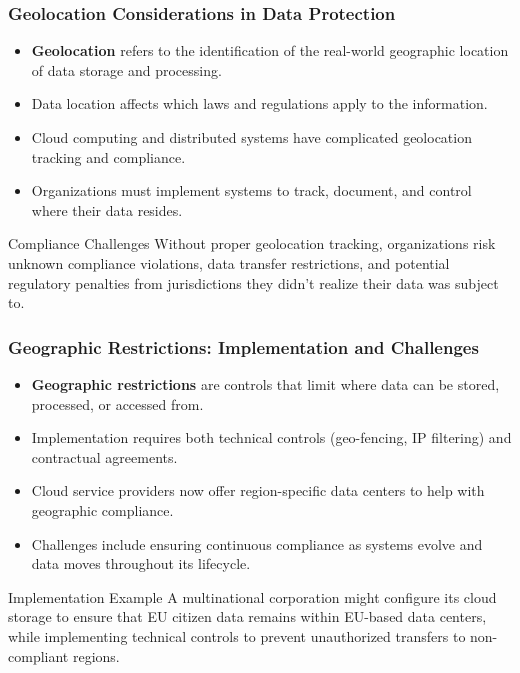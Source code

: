 \documentclass{beamer}
\begin{document}
\begin{frame}
\frametitle{Geolocation Considerations in Data Protection}
\begin{itemize}
\item \textbf{Geolocation} refers to the identification of the real-world geographic location of data storage and processing.
\item Data location affects which laws and regulations apply to the information.
\item Cloud computing and distributed systems have complicated geolocation tracking and compliance.
\item Organizations must implement systems to track, document, and control where their data resides.
\end{itemize}

\begin{alertblock}{Compliance Challenges}
Without proper geolocation tracking, organizations risk unknown compliance violations, data transfer restrictions, and potential regulatory penalties from jurisdictions they didn't realize their data was subject to.
\end{alertblock}
\end{frame}

\begin{frame}
\frametitle{Geographic Restrictions: Implementation and Challenges}
\begin{itemize}
\item \textbf{Geographic restrictions} are controls that limit where data can be stored, processed, or accessed from.
\item Implementation requires both technical controls (geo-fencing, IP filtering) and contractual agreements.
\item Cloud service providers now offer region-specific data centers to help with geographic compliance.
\item Challenges include ensuring continuous compliance as systems evolve and data moves throughout its lifecycle.
\end{itemize}

\begin{exampleblock}{Implementation Example}
A multinational corporation might configure its cloud storage to ensure that EU citizen data remains within EU-based data centers, while implementing technical controls to prevent unauthorized transfers to non-compliant regions.
\end{exampleblock}
\end{frame}
\end{document}
